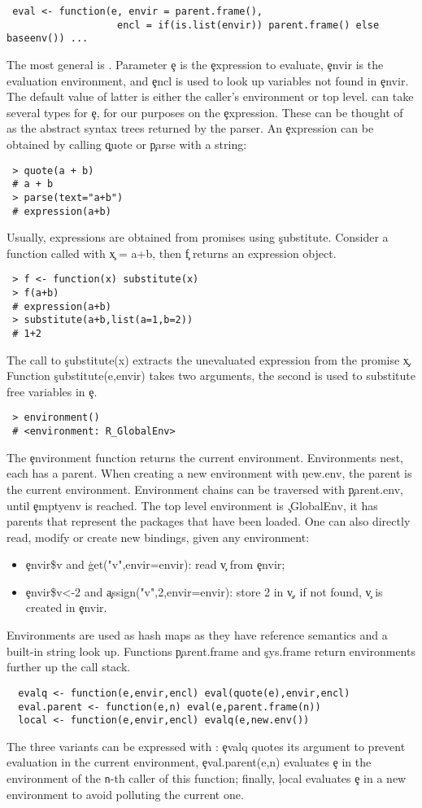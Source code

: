 \documentclass[screen,acmsmall]{acmart}
\begin{document}
\begin{lstlisting}
 eval <- function(e, envir = parent.frame(),
                   encl = if(is.list(envir)) parent.frame() else baseenv()) ...
\end{lstlisting}
The most general is \eval. Parameter \c e is the \c{expression} to evaluate,
\c{envir} is the evaluation environment, and \c{encl} is used to look up
variables not found in \c{envir}. The default value of latter is either the
caller's environment or top level. \Eval can take several types for \c e, for
our purposes on the \c{expression}. These can be thought of as the abstract
syntax trees returned by the parser. An \c{expression} can be obtained by
calling \c{quote} or \c{parse} with a string:
\begin{lstlisting}
 > quote(a + b)
 # a + b
 > parse(text="a+b")
 # expression(a+b)
\end{lstlisting}
Usually, expressions are obtained from promises using \c{substitute}. Consider a
function called with \c{x = a+b}, then \c f returns an expression object.
\begin{lstlisting}
 > f <- function(x) substitute(x)
 > f(a+b)
 # expression(a+b)
 > substitute(a+b,list(a=1,b=2))
 # 1+2
\end{lstlisting}
The call to \c{substitute(x)} extracts the unevaluated expression from the
promise \c x. Function \c{substitute(e,envir)} takes two arguments, the second
is used to substitute free variables in \c e.
\begin{lstlisting}
 > environment()
 # <environment: R_GlobalEnv>
\end{lstlisting}
The \c{environment} function returns the current environment. Environments nest,
each has a parent. When creating a new environment with \c{new.env}, the parent
is the current environment. Environment chains can be traversed with
\c{parent.env}, until \c{emptyenv} is reached. The top level environment is
\c{.GlobalEnv}, it has parents that represent the packages that have been
loaded. One can also directly read, modify or create new bindings, given any
environment:
\begin{itemize}
\item \c{envir\$v} and \c{get("v",envir=envir)}: read  \c{v} from \c{envir};
\item \c{envir\$v<-2} and \c{assign("v",2,envir=envir)}: store 2 in \c{v}, if
  not found, \c{v} is created in \c{envir}.
\end{itemize}
\noindent Environments are used as hash maps as they have reference semantics
and a built-in string look up. Functions \c{parent.frame} and \c{sys.frame}
return environments further up the call stack.
 \begin{lstlisting}
  evalq <- function(e,envir,encl) eval(quote(e),envir,encl)
  eval.parent <- function(e,n) eval(e,parent.frame(n))
  local <- function(e,envir,encl) evalq(e,new.env())
\end{lstlisting}
The three variants can be expressed with \eval: \c{evalq} quotes its
argument to prevent evaluation in the current environment,
\c{eval.parent(e,n)} evaluates \c{e} in the environment of the {\tt n}-th
caller of this function; finally, \c{local} evaluates \c{e} in a new environment
to avoid polluting the current one.
\end{document}
